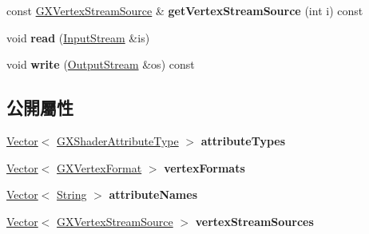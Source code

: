 \begin{DoxyCompactItemize}
\item 
const \hyperlink{class_i_dream_sky_1_1_g_x_vertex_stream_source}{G\+X\+Vertex\+Stream\+Source} \& {\bfseries get\+Vertex\+Stream\+Source} (int i) const \hypertarget{class_i_dream_sky_1_1_attributes_block_aae8e65e3a1ca1fd9e156f0cd03dda51b}{}\label{class_i_dream_sky_1_1_attributes_block_aae8e65e3a1ca1fd9e156f0cd03dda51b}

\item 
void {\bfseries read} (\hyperlink{class_i_dream_sky_1_1_input_stream}{Input\+Stream} \&is)\hypertarget{class_i_dream_sky_1_1_attributes_block_ae702579994fbe5527bfd207e11da4efc}{}\label{class_i_dream_sky_1_1_attributes_block_ae702579994fbe5527bfd207e11da4efc}

\item 
void {\bfseries write} (\hyperlink{class_i_dream_sky_1_1_output_stream}{Output\+Stream} \&os) const \hypertarget{class_i_dream_sky_1_1_attributes_block_a0c573cc33e9401bd68504ec3ef95e636}{}\label{class_i_dream_sky_1_1_attributes_block_a0c573cc33e9401bd68504ec3ef95e636}

\end{DoxyCompactItemize}
\subsection*{公開屬性}
\begin{DoxyCompactItemize}
\item 
\hyperlink{class_i_dream_sky_1_1_vector}{Vector}$<$ \hyperlink{class_i_dream_sky_1_1_g_x_shader_attribute_type}{G\+X\+Shader\+Attribute\+Type} $>$ {\bfseries attribute\+Types}\hypertarget{class_i_dream_sky_1_1_attributes_block_a7041f6e11451e14ebed35608435d4027}{}\label{class_i_dream_sky_1_1_attributes_block_a7041f6e11451e14ebed35608435d4027}

\item 
\hyperlink{class_i_dream_sky_1_1_vector}{Vector}$<$ \hyperlink{class_i_dream_sky_1_1_g_x_vertex_format}{G\+X\+Vertex\+Format} $>$ {\bfseries vertex\+Formats}\hypertarget{class_i_dream_sky_1_1_attributes_block_a4bba1643ba755a4bf57c96935597d806}{}\label{class_i_dream_sky_1_1_attributes_block_a4bba1643ba755a4bf57c96935597d806}

\item 
\hyperlink{class_i_dream_sky_1_1_vector}{Vector}$<$ \hyperlink{class_i_dream_sky_1_1_string}{String} $>$ {\bfseries attribute\+Names}\hypertarget{class_i_dream_sky_1_1_attributes_block_a08901efccec572c0bfe60dc705132132}{}\label{class_i_dream_sky_1_1_attributes_block_a08901efccec572c0bfe60dc705132132}

\item 
\hyperlink{class_i_dream_sky_1_1_vector}{Vector}$<$ \hyperlink{class_i_dream_sky_1_1_g_x_vertex_stream_source}{G\+X\+Vertex\+Stream\+Source} $>$ {\bfseries vertex\+Stream\+Sources}\hypertarget{class_i_dream_sky_1_1_attributes_block_ad8ba4d2a4fee265e9844eec8fa2c0321}{}\label{class_i_dream_sky_1_1_attributes_block_ad8ba4d2a4fee265e9844eec8fa2c0321}

\end{DoxyCompactItemize}


